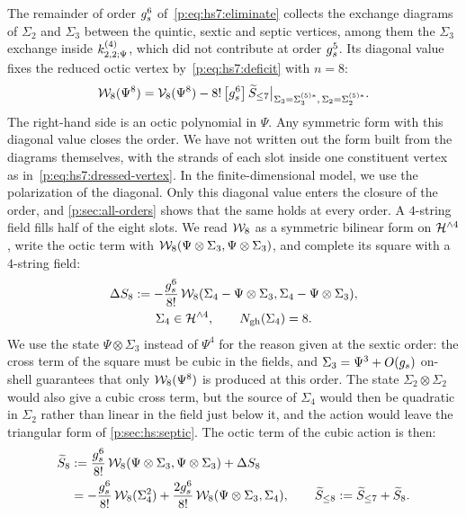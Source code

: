 The remainder of order $\gs^6$ of~\eqref{p:eq:hs7:eliminate} collects the exchange diagrams of $\Sigma_2$ and $\Sigma_3$ between the quintic, sextic and septic vertices, among them the $\Sigma_3$ exchange inside $\kin{2}{\Psi}{4}$, which did not contribute at order $\gs^5$.
Its diagonal value fixes the reduced octic vertex by~\eqref{p:eq:hs7:deficit} with $n = 8$:
\begin{equation}
  \label{p:eq:hs8:diagonal}
  \dvertex{8}(\Psi^8)
    = \vertex{8}(\Psi^8) - 8! \, \big[ \gs^6 \big] \, \caction[\le 7] \big|_{\Sigma_3 = \Sigma_3^{(5)*}, \, \Sigma_2 = \Sigma_2^{(5)*}}.
\end{equation}
The right-hand side is an octic polynomial in $\Psi$.
Any symmetric form with this diagonal value closes the order.
We have not written out the form built from the diagrams themselves, with the strands of each slot inside one constituent vertex as in~\eqref{p:eq:hs7:dressed-vertex}.
  In the finite-dimensional model, we use the polarization of the diagonal.
Only this diagonal value enters the closure of the order, and \cref{p:sec:all-orders} shows that the same holds at every order.
A $4$-string field fills half of the eight slots.
We read $\dvertex{8}$ as a symmetric bilinear form on $\Hn{4}$, write the octic term with $\dvertex{8}(\Psi \otimes \Sigma_3, \Psi \otimes \Sigma_3)$, and complete its square with a $4$-string field:
\begin{equation}
  \label{p:eq:hs8:DeltaS8}
  \begin{gathered}
    \Delta S_8
      := - \frac{\gs^6}{8!} \, \dvertex{8}(\Sigma_4 - \Psi \otimes \Sigma_3, \Sigma_4 - \Psi \otimes \Sigma_3),
    \\
    \Sigma_4 \in \Hn{4},
    \qquad
    \Ngh(\Sigma_4)
      = 8.
  \end{gathered}
\end{equation}
We use the state $\Psi \otimes \Sigma_3$ instead of $\Psi^4$ for the reason given at the sextic order: the cross term of the square must be cubic in the fields, and $\Sigma_3 = \Psi^3 + O(\gs)$ on-shell guarantees that only $\dvertex{8}(\Psi^8)$ is produced at this order.
The state $\Sigma_2 \otimes \Sigma_2$ would also give a cubic cross term, but the source of $\Sigma_4$ would then be quadratic in $\Sigma_2$ rather than linear in the field just below it, and the action would leave the triangular form of \cref{p:sec:hs:septic}.
The octic term of the cubic action is then:
\begin{equation}
  \label{p:eq:hs8:S8tilde}
  \begin{aligned}
    \caction[8]
      &
      := \frac{\gs^6}{8!} \, \dvertex{8}(\Psi \otimes \Sigma_3, \Psi \otimes \Sigma_3) + \Delta S_8
    \\ &
      = - \frac{\gs^6}{8!} \, \dvertex{8}(\Sigma_4^2)
        + \frac{2 \gs^6}{8!} \, \dvertex{8}(\Psi \otimes \Sigma_3, \Sigma_4),
    \qquad
    \caction[\le 8]
      := \caction[\le 7] + \caction[8].
  \end{aligned}
\end{equation}
